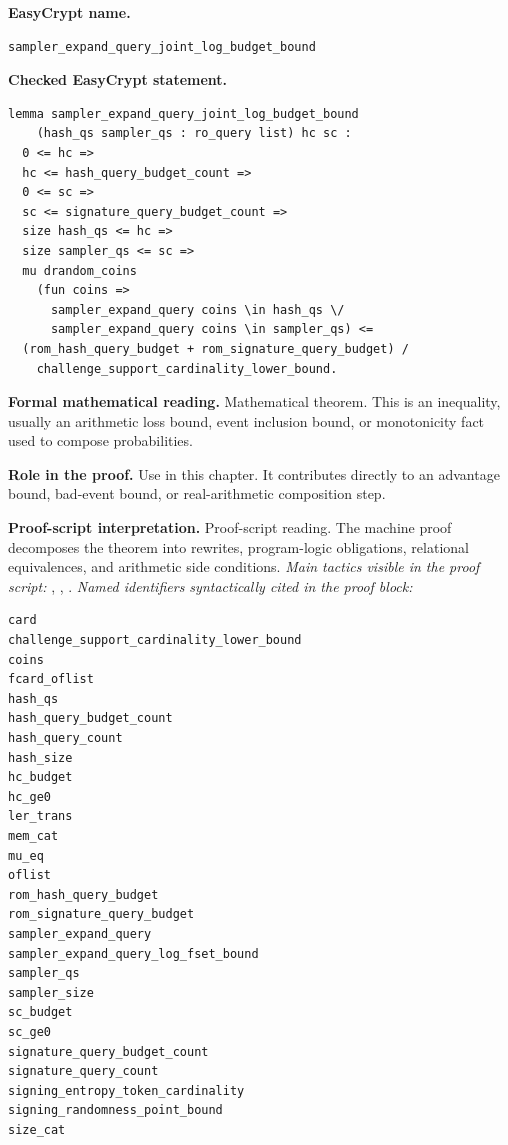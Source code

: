 \begin{formaltheorem}
\noindent\textbf{EasyCrypt name.}
\begin{lstlisting}[language=EasyCrypt,basicstyle=\ttfamily\scriptsize]
sampler_expand_query_joint_log_budget_bound
\end{lstlisting}
\noindent\textbf{Checked EasyCrypt statement.}
\begin{lstlisting}[language=EasyCrypt,basicstyle=\ttfamily\scriptsize]
lemma sampler_expand_query_joint_log_budget_bound
    (hash_qs sampler_qs : ro_query list) hc sc :
  0 <= hc =>
  hc <= hash_query_budget_count =>
  0 <= sc =>
  sc <= signature_query_budget_count =>
  size hash_qs <= hc =>
  size sampler_qs <= sc =>
  mu drandom_coins
    (fun coins =>
      sampler_expand_query coins \in hash_qs \/
      sampler_expand_query coins \in sampler_qs) <=
  (rom_hash_query_budget + rom_signature_query_budget) /
    challenge_support_cardinality_lower_bound.
\end{lstlisting}
\noindent\textbf{Formal mathematical reading.}
Mathematical theorem. This is an inequality, usually an arithmetic loss bound, event inclusion bound, or monotonicity fact used to compose probabilities.

\noindent\textbf{Role in the proof.}
Use in this chapter. It contributes directly to an advantage bound, bad-event bound, or real-arithmetic composition step.

\noindent\textbf{Proof-script interpretation.}
Proof-script reading. The machine proof decomposes the theorem into rewrites, program-logic obligations, relational equivalences, and arithmetic side conditions.
\emph{Main tactics visible in the proof script:} , , .
\emph{Named identifiers syntactically cited in the proof block:}
\begin{lstlisting}[language=EasyCrypt,basicstyle=\ttfamily\scriptsize]
card
challenge_support_cardinality_lower_bound
coins
fcard_oflist
hash_qs
hash_query_budget_count
hash_query_count
hash_size
hc_budget
hc_ge0
ler_trans
mem_cat
mu_eq
oflist
rom_hash_query_budget
rom_signature_query_budget
sampler_expand_query
sampler_expand_query_log_fset_bound
sampler_qs
sampler_size
sc_budget
sc_ge0
signature_query_budget_count
signature_query_count
signing_entropy_token_cardinality
signing_randomness_point_bound
size_cat
\end{lstlisting}

\end{formaltheorem}

